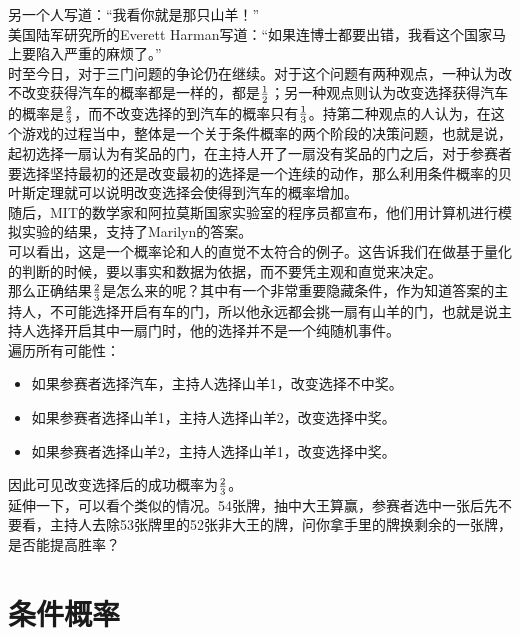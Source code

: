 另一个人写道：“我看你就是那只山羊！”\\

美国陆军研究所的Everett Harman写道：“如果连博士都要出错，我看这个国家马上要陷入严重的麻烦了。”\\

时至今日，对于三门问题的争论仍在继续。对于这个问题有两种观点，一种认为改不改变获得汽车的概率都是一样的，都是$ 1 \over 2 $；另一种观点则认为改变选择获得汽车的概率是$ 2 \over 3 $，而不改变选择的到汽车的概率只有$ 1 \over 3 $。持第二种观点的人认为，在这个游戏的过程当中，整体是一个关于条件概率的两个阶段的决策问题，也就是说，起初选择一扇认为有奖品的门，在主持人开了一扇没有奖品的门之后，对于参赛者要选择坚持最初的还是改变最初的选择是一个连续的动作，那么利用条件概率的贝叶斯定理就可以说明改变选择会使得到汽车的概率增加。\\

随后，MIT的数学家和阿拉莫斯国家实验室的程序员都宣布，他们用计算机进行模拟实验的结果，支持了Marilyn的答案。\\

可以看出，这是一个概率论和人的直觉不太符合的例子。这告诉我们在做基于量化的判断的时候，要以事实和数据为依据，而不要凭主观和直觉来决定。\\

那么正确结果$ 2 \over 3 $是怎么来的呢？其中有一个非常重要隐藏条件，作为知道答案的主持人，不可能选择开启有车的门，所以他永远都会挑一扇有山羊的门，也就是说主持人选择开启其中一扇门时，他的选择并不是一个纯随机事件。\\

遍历所有可能性：

\begin{itemize}
	\item 如果参赛者选择汽车，主持人选择山羊1，改变选择不中奖。
	\item 如果参赛者选择山羊1，主持人选择山羊2，改变选择中奖。
	\item 如果参赛者选择山羊2，主持人选择山羊1，改变选择中奖。
\end{itemize}

因此可见改变选择后的成功概率为$ 2 \over 3 $。\\

延伸一下，可以看个类似的情况。54张牌，抽中大王算赢，参赛者选中一张后先不要看，主持人去除53张牌里的52张非大王的牌，问你拿手里的牌换剩余的一张牌，是否能提高胜率？

\newpage

\section{条件概率}

